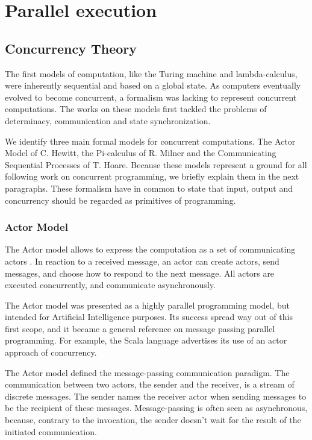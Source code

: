 \section{Parallel execution}


\subsection{Concurrency Theory}

The first models of computation, like the Turing machine and lambda-calculus, were inherently sequential and based on a global state.
As computers eventually evolved to become concurrent, a formalism was lacking  to represent concurrent computations.
The works on these models first tackled the problems of determinacy, communication and state synchronization.

We identify three main formal models for concurrent computations.
The Actor Model of C. Hewitt, the Pi-calculus of R. Milner and the Communicating Sequential Processes of T. Hoare.
Because these models represent a ground for all following work on concurrent programming, we briefly explain them in the next paragraphs.
These formalism have in common to state that input, output and concurrency should be regarded as primitives of programming.


\subsubsection{Actor Model}

The Actor model allows to express the computation as a set of communicating actors \cite{Hewitt1973a, Hewitt1977, Clinger1981}.
In reaction to a received message, an actor can create actors, send messages, and choose how to respond to the next message.
All actors are executed concurrently, and communicate asynchronously.

The Actor model was presented as a highly parallel programming model, but intended for Artificial Intelligence purposes.
Its success spread way out of this first scope, and it became a general reference on message passing parallel programming.
For example, the Scala language advertises its use of an actor approach of concurrency.


The Actor model defined the message-passing communication paradigm.
The communication between two actors, the sender and the receiver, is a stream of discrete messages.
The sender names the receiver actor when sending messages to be the recipient of these messages.
Message-passing is often seen as asynchronous, because, contrary to the invocation, the sender doesn't wait for the result of the initiated communication. 

